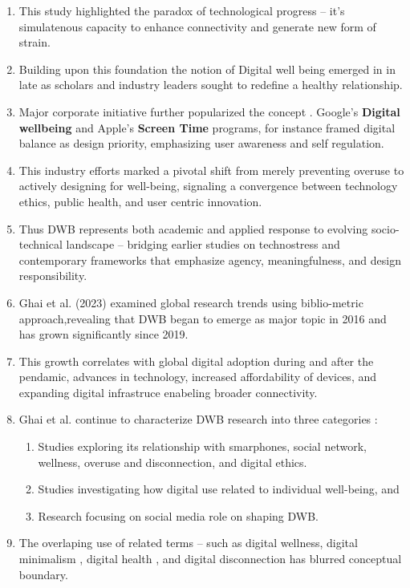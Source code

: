 \documentclass[12pt]{article}
\begin{document}
\begin{enumerate}
    \item This study highlighted the paradox of technological progress -- it's simulatenous capacity to enhance connectivity and generate new form of strain.
    \item Building upon this foundation the notion of Digital well being emerged in in late \cite{2010} as scholars and industry leaders sought to redefine a healthy relationship.
    \item Major corporate initiative further popularized the concept . Google's \textbf{Digital wellbeing} and Apple's \textbf{Screen Time} programs, for instance framed digital balance as design priority, emphasizing user awareness and self regulation.
    \item This industry efforts marked a pivotal shift from merely preventing overuse to actively designing for well-being, signaling a convergence between technology ethics, public health, and user centric innovation.
    \item Thus DWB represents both academic and applied response to evolving socio-technical landscape -- bridging earlier studies on technostress  and contemporary frameworks that emphasize agency, meaningfulness, and design responsibility.
    \item Ghai et al. (2023) \cite{ghai2023digital}  examined global research trends using biblio-metric approach,revealing that DWB began to emerge as major topic in 2016 and has grown significantly since 2019.
    \item This growth correlates with global digital adoption during and after the pendamic, advances in technology, increased affordability of devices, and expanding digital infrastruce enabeling broader connectivity.
    \item Ghai et al. continue to characterize DWB research into three categories :
    \begin{enumerate}
        \item Studies exploring its relationship with smarphones, social network, wellness, overuse and disconnection, and digital ethics. 
        \item Studies investigating how digital use related to individual well-being, and 
        \item Research focusing on social media role on shaping DWB.
    \end{enumerate}
    \item The overlaping use of related terms -- such as digital wellness, digital minimalism \cite{dadischeck2021digital},  digital health \cite{smits2022digital}, and digital disconnection \cite{burr2020ethics} has blurred conceptual boundary.

\end{enumerate}
\end{document}
